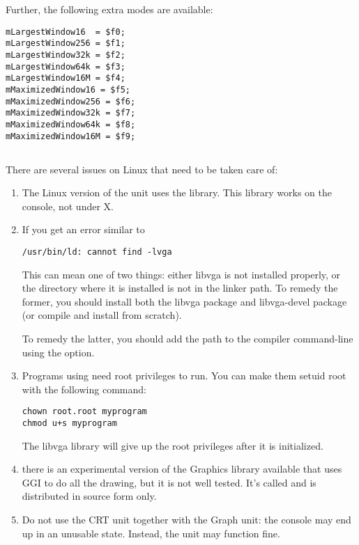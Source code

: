 Further, the following extra modes are available:
\begin{verbatim}
mLargestWindow16  = $f0;
mLargestWindow256 = $f1;
mLargestWindow32k = $f2;
mLargestWindow64k = $f3;
mLargestWindow16M = $f4;
mMaximizedWindow16 = $f5;
mMaximizedWindow256 = $f6;
mMaximizedWindow32k = $f7;
mMaximizedWindow64k = $f8;
mMaximizedWindow16M = $f9;
\end{verbatim}

\subsection{\linux}
There are several issues on Linux that need to be taken care of:
\begin{enumerate}
\item The Linux version of the  unit uses the  
library. This library works on the console, not under X.
\item If you get an error similar to
\begin{verbatim}
/usr/bin/ld: cannot find -lvga
\end{verbatim}
This can mean one of two things: either libvga is not installed properly, or
the directory where it is installed is not in the linker path. To remedy the
former, you should install both the libvga package and libvga-devel package
(or compile and install from scratch).

To remedy the latter, you should add the path to the compiler command-line
using the  option.
\item Programs using  need root privileges to run. 
You can make them setuid root with the following command:
\begin{verbatim}
chown root.root myprogram
chmod u+s myprogram
\end{verbatim}
The libvga library will give up the root privileges after it is initialized.
\item there is an experimental version of the Graphics library available that
uses GGI to do all the drawing, but it is not well tested. It's called
 and is distributed in source form only.
\item Do not use the CRT unit together with the Graph unit: the console may
end up in an unusable state. Instead, the  unit may function 
fine.
\end{enumerate}

